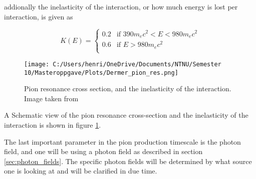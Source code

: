 addionally the inelasticity of the interaction, or how much energy is lost per interaction, is given as

\begin{equation}
    K(E) = 
    \begin{cases} 
    0.2 & \text{if } 390 m_e c^2 < E < 980 m_e c^2 \\
    0.6 & \text{if } E > 980 m_e c^2 \\

\end{cases}
\end{equation}


\begin{figure}
    \centering
    \texttt{[image: C:/Users/henri/OneDrive/Documents/NTNU/Semester 10/Masteroppgave/Plots/Dermer\_pion\_res.png]}
    \caption{Pion resonance cross section, and the inelasticity of the interaction. Image taken from \cite{BHradiation}}
    \label{fig:pion_res}
\end{figure}
A Schematic view of the pion resonance cross-section and the inelasticity of the interaction is shown in figure \ref{fig:pion_res}. 

The last important parameter in the pion production timescale is the photon field, and one will be using a photon field as described in section \ref{sec:photon_fields}. The specific photon fields will be determined by what source one is looking at and will be clarified in due time. 

